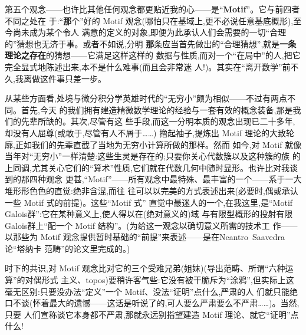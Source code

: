 第五个观念——也许比其他任何观念都更贴近我的心——是“\textbf{Motif}”。它与前四者不同之处在
于:“\textbf{那}个”好的 Motif 观念(哪怕只在基域上,更不必说任意基底概形),至今尚未成为某个令人
满意的定义的对象,即便为此承认人们会需要的一切“合理的”猜想也无济于事。或者不如说,分明
\dmark{}\textbf{那}条应当首先做出的“合理猜想”,就是\textbf{一条理论之\textbf{存在}}的猜想——它满足这样这样的
数据与性质,而对一个“在局中”的人,把它完全显式地陈述出来,本不是什么难事(而且会非常迷
人!)。其实在“离开数学”前不久,我离做这件事只差一步。

从某些方面看,处境与微分积分学英雄时代的“无穷小”颇为相似——不过有两点不同。首先,今天
的我们拥有建造精微数学理论的经验与一套有效的概念装备,那是我们的先辈所缺的。其次,尽管有这
些手段,而这一分明本质的观念出现已二十多年,却没有人屈尊(或敢于,尽管有人不屑于……)
撸起袖子,提炼出 Motif 理论的大致轮廓,正如我们的先辈直截了当地为无穷小计算所做的那样。然而
如今,对 Motif 就像当年对“无穷小”一样清楚:这些生灵是存在的;只要你关心代数簇以及这种簇的族
的上同调,尤其关心它们的“算术”性质,它们就在代数几何中随时显形。也许比对我谈到的那四种观念
更甚,“Motif”——所有观念中最特殊、最丰富的一个——系于一大堆形形色色的直觉:绝非含混,而往
往可以\dmark{}以完美的方式表述出来(必要时,偶或承认一些 Motif 式的前提)。这些“Motif 式”
直觉中最迷人的一个,在我这里,是“Motif Galois群”:它在某种意义上,使人得以在(绝对意义的)域
与有限型概形的投射有限Galois群上“配一个 Motif 结构”。(为给这一观念以确切意义所需的技术工
作——以那些为 Motif 观念提供暂时基础的“前提”来表述——是在Neantro~Saavedra论“塔纳卡
范畴”的论文里完成的。)

时下的共识,对 Motif 观念比对它的三个受难兄弟(姐妹)(导出范畴、所谓“六种运算”的对偶形式
主义、topos)要稍许客气些:它没有被干脆斥为“涂鸦”,但实际上这毫无区别:只要没办法“定义”一个 Motif、没法“证明”点什么,严肃的人
们就只能绝口不谈(怀着最大的遗憾——这话是听说了的,可人要么严肃要么不严肃……)。当然,只要
人们宣称谈它本身都不严肃,那就永远别指望建造 Motif 理论、就它“证明”点什么!

